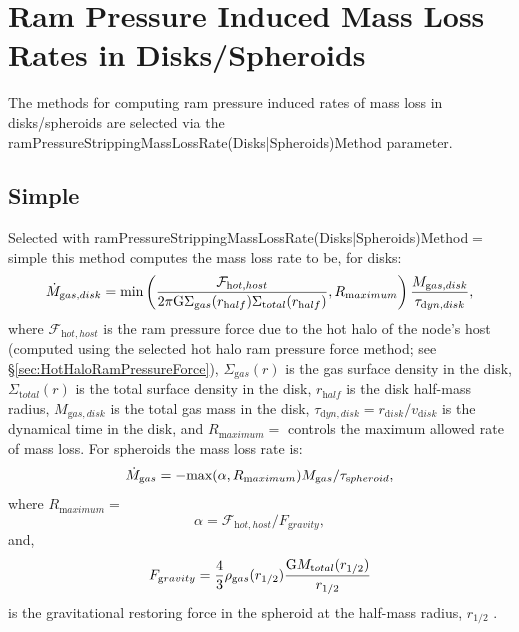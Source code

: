 \section{Ram Pressure Induced Mass Loss Rates in Disks/Spheroids}\label{sec:RamPressureMassLossRates}

The methods for computing ram pressure induced rates of mass loss in disks/spheroids are selected via the {\normalfont \ttfamily ramPressureStrippingMassLossRate(Disks|Spheroids)Method} parameter.

\subsection{Simple}

Selected with {\normalfont \ttfamily ramPressureStrippingMassLossRate(Disks|Spheroids)Method}$=${\normalfont \ttfamily simple} this method computes the mass loss rate to be, for disks:
\begin{equation}
 \dot{M}_{\mathrm gas, disk} = \hbox{min}\left({\mathcal{F}_{\mathrm hot, host} \over 2 \pi {\mathrm G} \Sigma_{\mathrm gas}(r_{\mathrm half}) \Sigma_{\mathrm total}(r_{\mathrm half})}, R_{\mathrm maximum}\right) {M_{\mathrm gas, disk} \over \tau_{\mathrm dyn, disk}},
\end{equation}
where $\mathcal{F}_{\mathrm hot, host}$ is the ram pressure force due to the hot halo of the node's host (computed using the selected hot halo ram pressure force method; see \S\ref{sec:HotHaloRamPressureForce}), $\Sigma_{\mathrm gas}(r)$ is the gas surface density in the disk, $\Sigma_{\mathrm total}(r)$ is the total surface density in the disk, $r_{\mathrm half}$ is the disk half-mass radius, $M_{\mathrm gas, disk}$ is the total gas mass in the disk, $\tau_{\mathrm dyn, disk} = r_{\mathrm disk}/v_{\mathrm disk}$ is the dynamical time in the disk, and $R_{\mathrm maximum}=${\normalfont \ttfamily [ramPressureStrippingMassLossRateDiskSimpleFractionalRateMaximum]} controls the maximum allowed rate of mass loss. For spheroids the mass loss rate is:
\begin{equation}
\dot{M}_{\mathrm gas} = -\hbox{max}(\alpha,R_{\mathrm maximum}) M_{\mathrm gas}/\tau_{\mathrm spheroid},
\end{equation}
where $R_{\mathrm maximum}=${\normalfont \ttfamily [ramPressureStrippingMassLossRateSpheroidSimpleFractionalRateMax]}
\begin{equation}
\alpha = \mathcal{F}_{\mathrm hot,host}/F_{\mathrm gravity},
\end{equation}
and,
\begin{equation}
F_{\mathrm gravity} = {4\over 3} \rho_{\mathrm gas}(r_{1/2}) {{\mathrm G} M_{\mathrm total}(r_{1/2})\over r_{1/2}}
\end{equation}
is the gravitational restoring force in the spheroid at the half-mass radius, $r_{\mathrm 1/2}$ \citep{takeda_ram_1984}.



